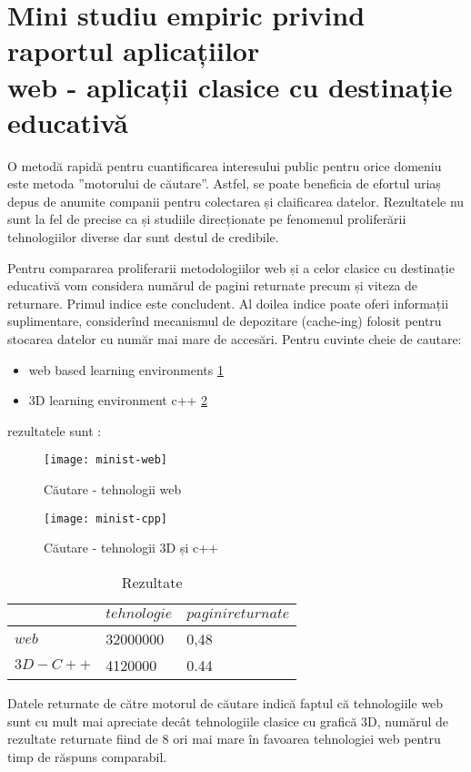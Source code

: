 \section{Mini studiu empiric privind raportul aplicațiilor \\ web - aplicații clasice cu destinație educativă}
\par O metodă rapidă pentru cuantificarea interesului public pentru orice domeniu este metoda ”motorului de căutare”. Astfel, se poate beneficia de efortul uriaș depus de anumite companii pentru colectarea și claificarea datelor. Rezultatele nu sunt la fel de precise ca și studiile direcționate pe fenomenul proliferării tehnologiilor diverse dar sunt destul de credibile.
\par Pentru compararea proliferarii metodologiilor web și a celor clasice cu destinație educativă vom considera numărul de pagini returnate precum și viteza de returnare. Primul indice este concludent. Al doilea indice poate oferi informații suplimentare, considerînd mecanismul de depozitare (cache-ing) folosit pentru stocarea datelor cu număr mai mare de accesări. Pentru cuvinte cheie de cautare:
\begin{itemize}
\item web based learning environments \ref{fig:imag1}
\item 3D learning environment c++ \ref{fig:imag2}
\end{itemize}
rezultatele sunt :

\begin{figure}[h, scale=2.0]
    \centering
    \texttt{[image: minist-web]}
    \caption{Căutare - tehnologii web}
    \label{fig:imag1}
\end{figure}

\begin{figure}[h, scale=2.0]
    \centering
    \texttt{[image: minist-cpp]}
    \caption{Căutare - tehnologii 3D și c++}
    \label{fig:imag2}
\end{figure}

\begin{table}
      \begin{center}
            \begin{tabular}{|l|l|l|}
                \hline 
                \cline{2-3}
                & $tehnologie$ & $pagini returnate$  \\ 
        	\hline
                $web$   &  32000000    &  0,48  \\
                $3D-C++$   &  4120000    &  0.44  \\
            \hline
	    \end{tabular}
        \end{center}
    \caption{Rezultate}
    \label{tab:rez}
\end{table}

\par Datele returnate de către motorul de căutare indică faptul că tehnologiile web sunt cu mult mai apreciate decât tehnologiile clasice cu grafică 3D, numărul de rezultate returnate fiind de 8 ori mai mare în favoarea tehnologiei web pentru timp de răspuns comparabil.